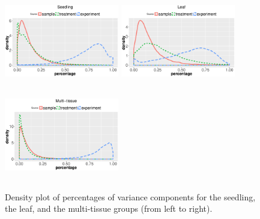 \documentclass[11pt, a4paper]{article}
\begin{document}
 \begin{figure}[h]
\begin{center}
\includegraphics[width=5cm,height=4cm]{Figures/var_dens1.eps}
\includegraphics[width=5cm,height=4cm]{Figures/var_dens2.eps}
\includegraphics[width=5cm,height=4cm]{Figures/var_dens3.eps}
\caption{ Density plot of percentages of variance components for the seedling, the leaf, and the multi-tissue groups (from left to right).}
\label{fig:densityplot}
\end{center}
\end{figure} 
\end{document}
